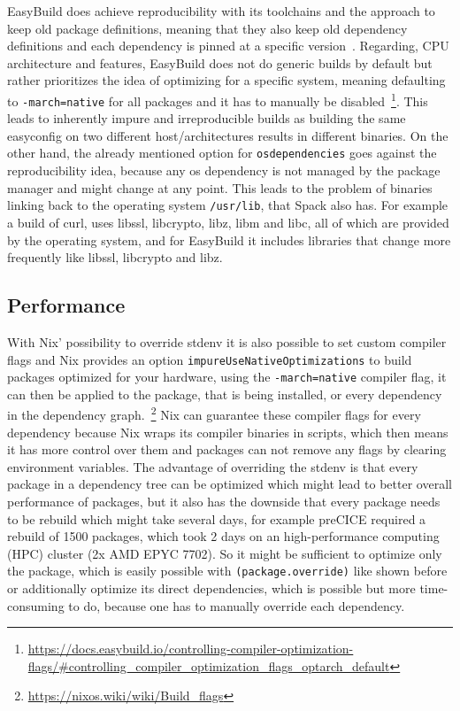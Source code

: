 \documentclass{eceasst}
\begin{document}
EasyBuild does achieve reproducibility with its toolchains and the approach to keep old package definitions, meaning that they also keep old dependency definitions and each dependency is pinned at a specific version~\cite{Geimer_2014}.
Regarding, CPU architecture and features, EasyBuild does not do generic builds by default but rather prioritizes the idea of optimizing for a specific system, meaning defaulting to \texttt{-march=native} for all packages and it has to manually be disabled~\footnote{\url{https://docs.easybuild.io/controlling-compiler-optimization-flags/\#controlling\_compiler\_optimization\_flags\_optarch\_default}}.
This leads to inherently impure and irreproducible builds as building the same easyconfig on two different host/architectures results in different binaries.
On the other hand, the already mentioned option for \texttt{osdependencies} goes against the reproducibility idea, because any os dependency is not managed by the package manager and might change at any point.
This leads to the problem of binaries linking back to the operating system \texttt{/usr/lib}, that Spack also has.
For example a build of curl, uses libssl, libcrypto, libz, libm and libc, all of which are provided by the operating system, and for EasyBuild it includes libraries that change more frequently like libssl, libcrypto and libz.\\

\subsection{Performance}

With Nix' possibility to override stdenv it is also possible to set custom compiler flags and Nix provides an option \texttt{impureUseNativeOptimizations} to build packages optimized for your hardware, using the \texttt{-march=native} compiler flag, it can then be applied to the package, that is being installed, or every dependency in the dependency graph.~\footnote{\url{https://nixos.wiki/wiki/Build_flags}}
Nix can guarantee these compiler flags for every dependency because Nix wraps its compiler binaries in scripts, which then means it has more control over them and packages can not remove any flags by clearing environment variables.
The advantage of overriding the stdenv is that every package in a dependency tree can be optimized which might lead to better overall performance of packages, but it also has the downside that every package needs to be rebuild which might take several days, for example preCICE required a rebuild of 1500 packages, which took 2 days on an high-performance computing (HPC) cluster (2x AMD EPYC 7702).
So it might be sufficient to optimize only the package, which is easily possible with \texttt{(package.override)} like shown before or additionally optimize its direct dependencies, which is possible but more time-consuming to do, because one has to manually override each dependency.
\end{document}
